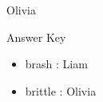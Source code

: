 \documentclass{article}
\begin{document}
\vspace{2ex}
Olivia

\pagebreak
\begin{center}
\Large Answer Key
\end{center}
\begin{itemize}
\item brash : Liam
\end{itemize}
\begin{itemize}
\item brittle : Olivia
\end{itemize}
\end{document}
